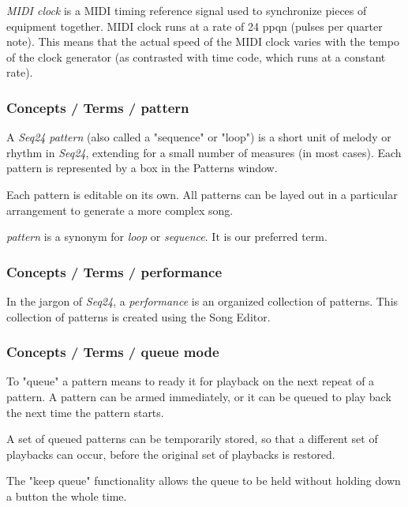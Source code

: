    \textsl{MIDI clock} is
   a MIDI timing reference signal used to synchronize pieces of equipment
   together. MIDI clock runs at a rate of 24 ppqn (pulses per quarter note).
   This means that the actual speed of the MIDI clock varies with the tempo
   of the clock generator (as contrasted with time code, which runs at a
   constant rate).

\subsubsection{Concepts / Terms / pattern}
\label{subsubsec:concepts_terms_pattern}

   A \textsl{Seq24} \textsl{pattern}
   (also called a "sequence" or "loop")
   is a short unit of melody or rhythm in \textsl{Seq24},
   extending for a small number of measures (in most cases).
   Each pattern is represented by a box in the Patterns window.

   Each pattern is editable on its own.  All patterns can be layed out in
   a particular arrangement to generate a more complex song.

   \textsl{pattern} is a synonym for \textsl{loop} or \textsl{sequence}.
   It is our preferred term.

\subsubsection{Concepts / Terms / performance}
\label{subsubsec:concepts_terms_performance}

   In the jargon of \textsl{Seq24}, a
   \textsl{performance} is an organized collection of patterns.
   This collection of patterns is created using the Song Editor.

\subsubsection{Concepts / Terms / queue mode}
\label{subsubsec:concepts_terms_queue_mode}

   To "queue" a pattern means to ready it for playback on the next repeat of
   a pattern.  A pattern can be armed immediately, or it can be queued to
   play back the next time the pattern starts.

   A set of queued patterns can be temporarily stored, so that a different
   set of playbacks can occur, before the original set of playbacks is
   restored.

   The "keep queue" functionality allows the queue to be held without
   holding down a button the whole time.

